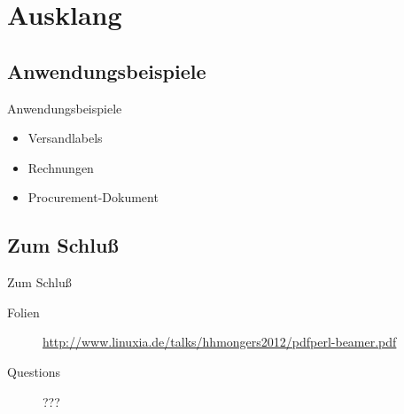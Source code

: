 \section{Ausklang}

\subsection{Anwendungsbeispiele}
\begin{frame}{Anwendungsbeispiele}
 \begin{itemize}
  \item Versandlabels
  \item Rechnungen
  \item Procurement-Dokument
  \end{itemize}
\end{frame}

\subsection{Zum Schluß}
\begin{frame}{Zum Schluß}
 \begin{description}
  \item[Folien]
    \url{http://www.linuxia.de/talks/hhmongers2012/pdfperl-beamer.pdf}
   \item[Questions] ???
 \end{description}
\end{frame}



